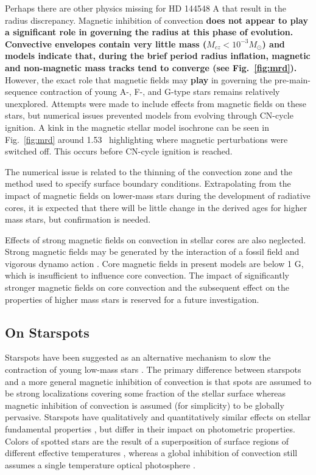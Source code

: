 \documentclass{aa}
\begin{document}
Perhaps there are other physics missing for HD 144548 A that result in the radius discrepancy. Magnetic inhibition of convection {\bf does not appear to play a significant role in governing the radius at this phase of evolution. Convective envelopes contain very little mass ($M_{cz} < 10^{-3} M_{\odot}$) and models indicate that, during the brief period radius inflation, magnetic and non-magnetic mass tracks tend to converge (see Fig.~\ref{fig:mrd}).} However, the exact role that magnetic fields may {\bf play} in governing the pre-main-sequence contraction of young A-, F-, and G-type stars remains relatively unexplored. Attempts were made to include effects from magnetic fields on these stars, but numerical issues prevented models from evolving through CN-cycle ignition. A kink in the magnetic stellar model isochrone can be seen in Fig.\ \ref{fig:mrd} around 1.53 \msun\ highlighting where magnetic perturbations were switched off. This occurs before CN-cycle ignition is reached.  

The numerical issue is related to the thinning of the convection zone and the method used to specify surface boundary conditions. 
Extrapolating from the impact of magnetic fields on lower-mass stars during the development of radiative cores, it is expected that there will be little change in the derived ages for higher mass stars, but confirmation is needed.

Effects of strong magnetic fields on convection in stellar cores are also neglected. Strong magnetic fields may be generated by the interaction of a fossil field and vigorous dynamo action \citep[e.g.,][]{Featherstone2009}. Core magnetic fields in present models are below 1 G, which is insufficient to influence core convection. The impact of significantly stronger magnetic fields on core convection and the subsequent effect on the properties of higher mass stars is reserved for a future investigation. 

\subsection{On Starspots}
Starspots have been suggested as an alternative mechanism to slow the contraction of young low-mass stars \citep{Jackson2009, MM10, Jackson2014a, Somers2015b}. The primary difference between starspots and a more general magnetic inhibition of convection is that spots are assumed to be strong localizations covering some fraction of the stellar surface whereas magnetic inhibition of convection is assumed (for simplicity) to be globally pervasive. Starspots have qualitatively and quantitatively similar effects on stellar fundamental properties \citep[radius, \teff, luminosity;][]{Spruit1982a,Spruit1986,Somers2015b}, but differ in their impact on photometric properties. Colors of spotted stars are the result of a superposition of surface regions of different effective temperatures \citep{Spruit1986}, whereas a global inhibition of convection still assumes a single temperature optical photosphere \citep{Jackson2014a}.
\end{document}
